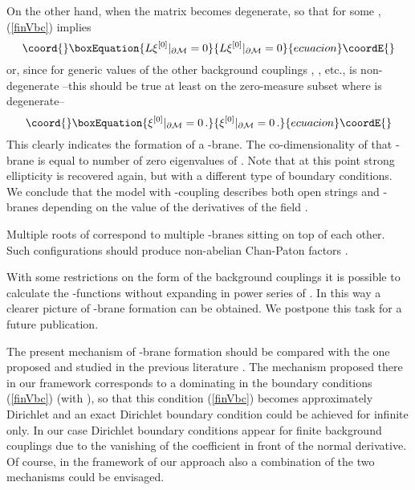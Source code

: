 \documentclass[a4paper,12pt]{article}
\providecommand{\oB}{|_{\partial{\cal M}}}
\begin{document}
On the other hand,
when the matrix \coordHE{} becomes degenerate, so that
\coordHE{} for some 
\coordHE{},  (\ref{finVbc}) implies
\begin{equation}\coord{}\boxEquation{
L\xi^{[0]}\oB =0 \label{Dir21}
}{
L\xi^{[0]}\oB =0 }{ecuacion}\coordE{}\end{equation}
or, since for generic values of the other background couplings
\coordHE{}, \coordHE{}, etc., 
\coordHE{} is non-degenerate --this should be true at least
on the zero-measure subset where \coordHE{} is degenerate--
\begin{equation}\coord{}\boxEquation{
\xi^{[0]}\oB =0 \label{Dir31}\,.
}{
\xi^{[0]}\oB =0 \,.
}{ecuacion}\coordE{}\end{equation}
This clearly indicates the formation of a \coordHE{}-brane.
The co-dimensionality of that \coordHE{}-brane is equal to number
of zero eigenvalues of \coordHE{}. Note  that
at this point strong ellipticity is recovered again,
but with a different type of boundary conditions.
We conclude that the model with \coordHE{}-coupling
describes both open strings and \coordHE{}-branes depending
on the value of the derivatives of the field \coordHE{}.

Multiple roots of \coordHE{} correspond to multiple
\coordHE{}-branes sitting on top of each other. Such configurations
should produce non-abelian Chan-Paton factors 
\cite{Polchinski95}.

With some restrictions on the form of the background
couplings it is possible to calculate the \myHighlight{$\beta$}\coordHE{}-functions
without expanding in power series of \coordHE{}. In this way
a clearer picture of  \coordHE{}-brane formation can be obtained.
We postpone this task for a future publication.

The present mechanism of \coordHE{}-brane formation should be compared
with the one proposed and studied in the previous literature
\cite{Sen99,Harvey00,HKM00,Majumder00,Mello00,Moeller00,Husain00}.
The mechanism proposed there  in our framework  corresponds
to a dominating \coordHE{} in the boundary conditions
(\ref{finVbc}) (with \coordHE{}), so that this condition
(\ref{finVbc}) becomes approximately Dirichlet and an exact Dirichlet 
boundary condition could be achieved for infinite \coordHE{}
only. In our case Dirichlet boundary conditions appear
for finite background couplings due to the vanishing of the
coefficient in front of the normal derivative. Of course,
in the framework of our approach  also 
a combination of the two mechanisms could be envisaged.
\end{document}
